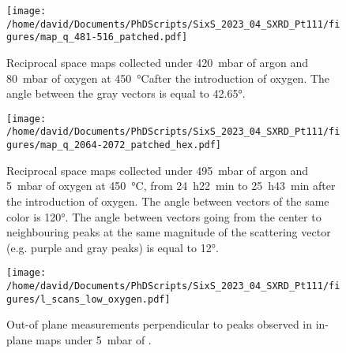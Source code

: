 
\begin{figure}[!htb]
    \centering
    \texttt{[image: /home/david/Documents/PhDScripts/SixS\_2023\_04\_SXRD\_Pt111/figures/map\_q\_481-516\_patched.pdf]}
    \caption{
        Reciprocal space maps collected under \qty{420}{\milli\bar} of argon and \qty{80}{\milli\bar} of oxygen at \qty{450}{\degreeCelsius}after the introduction of oxygen.
        The angle between the gray vectors is equal to \ang{42.65}.
    }
    \label{fig:481QSpace}
\end{figure}

\begin{figure}[!htb]
    \centering
    \texttt{[image: /home/david/Documents/PhDScripts/SixS\_2023\_04\_SXRD\_Pt111/figures/map\_q\_2064-2072\_patched\_hex.pdf]}
    \caption{
        Reciprocal space maps collected under \qty{495}{\milli\bar} of argon and \qty{5}{\milli\bar} of oxygen at \qty{450}{\degreeCelsius}, from \qty{24}{\hour}\qty{22}{\minute} to \qty{25}{\hour}\qty{43}{\minute} after the introduction of oxygen.
        The angle between vectors of the same color is \ang{120}.
        The angle between vectors going from the center to neighbouring peaks at the same magnitude of the scattering vector (e.g. purple and gray peaks) is equal to \ang{12}.
    }
    \label{fig:2064QSpace}
\end{figure}

\begin{figure}[!htb]
    \centering
    \texttt{[image: /home/david/Documents/PhDScripts/SixS\_2023\_04\_SXRD\_Pt111/figures/l\_scans\_low\_oxygen.pdf]}
    \caption{
        Out-of plane measurements perpendicular to peaks observed in in-plane maps under \qty{5}{\milli\bar} of \dioxygen.
    }
    \label{fig:LScans05}
\end{figure}

